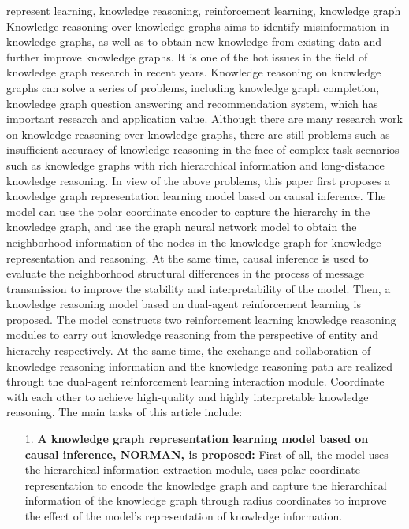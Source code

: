 \documentclass[algorithmlist, AutoFakeBold, AutoFakeSlant, figurelist, tablelist, nomlist, engineering]{seuthesix}
\begin{document}
\begin{englishabstract}{represent learning, knowledge reasoning, reinforcement learning, knowledge graph}
  Knowledge reasoning over knowledge graphs aims to identify misinformation in knowledge graphs, as well as to obtain new knowledge from existing data and further improve knowledge graphs. 
  It is one of the hot issues in the field of knowledge graph research in recent years. 
  Knowledge reasoning on knowledge graphs can solve a series of problems, including knowledge graph completion, knowledge graph question answering and recommendation system, which has important research and application value. 
  Although there are many research work on knowledge reasoning over knowledge graphs, there are still problems such as insufficient accuracy of knowledge reasoning in the face of complex task scenarios such as knowledge graphs with rich hierarchical information and long-distance knowledge reasoning. 
  In view of the above problems, this paper first proposes a knowledge graph representation learning model based on causal inference. 
  The model can use the polar coordinate encoder to capture the hierarchy in the knowledge graph, and use the graph neural network model to obtain the neighborhood information of the nodes in the knowledge graph for knowledge representation and reasoning. 
  At the same time, causal inference is used to evaluate the neighborhood structural differences in the process of message transmission to improve the stability and interpretability of the model.
  Then, a knowledge reasoning model based on dual-agent reinforcement learning is proposed. 
  The model constructs two reinforcement learning knowledge reasoning modules to carry out knowledge reasoning from the perspective of entity and hierarchy respectively. 
  At the same time, the exchange and collaboration of knowledge reasoning information and the knowledge reasoning path are realized through the dual-agent reinforcement learning interaction module. 
  Coordinate with each other to achieve high-quality and highly interpretable knowledge reasoning. 
  The main tasks of this article include:
  \begin{itemize}
    \item [1.]\textbf{A knowledge graph representation learning model based on causal inference, NORMAN, is proposed:}
    First of all, the model uses the hierarchical information extraction module, uses polar coordinate representation to encode the knowledge graph and capture the hierarchical information of the knowledge graph through radius coordinates to improve the effect of the model's representation of knowledge information.

\end{itemize}
\end{englishabstract}
\end{document}
